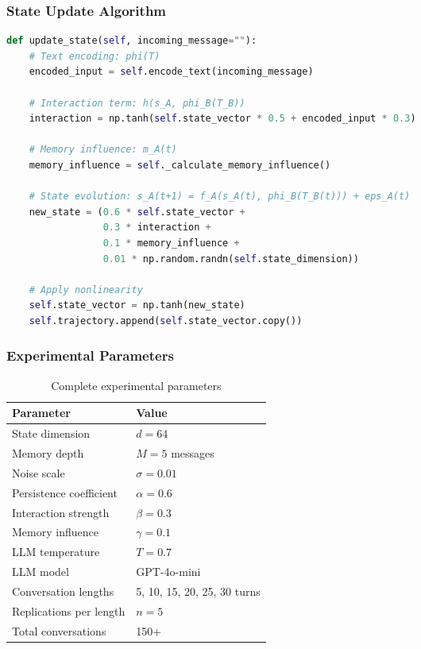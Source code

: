 \documentclass[11pt,a4paper]{article}
\begin{document}
\subsubsection{State Update Algorithm}

\begin{lstlisting}[language=Python, caption=Agent State Update Implementation]
def update_state(self, incoming_message=""):
    # Text encoding: phi(T)
    encoded_input = self.encode_text(incoming_message)
    
    # Interaction term: h(s_A, phi_B(T_B))
    interaction = np.tanh(self.state_vector * 0.5 + encoded_input * 0.3)
    
    # Memory influence: m_A(t)
    memory_influence = self._calculate_memory_influence()
    
    # State evolution: s_A(t+1) = f_A(s_A(t), phi_B(T_B(t))) + eps_A(t)
    new_state = (0.6 * self.state_vector + 
                 0.3 * interaction + 
                 0.1 * memory_influence + 
                 0.01 * np.random.randn(self.state_dimension))
    
    # Apply nonlinearity
    self.state_vector = np.tanh(new_state)
    self.trajectory.append(self.state_vector.copy())
\end{lstlisting}

\subsubsection{Experimental Parameters}

\begin{table}[ht]
\centering
\caption{Complete experimental parameters}
\begin{tabular}{@{}ll@{}}
\toprule
Parameter & Value \\
\midrule
State dimension & $d = 64$ \\
Memory depth & $M = 5$ messages \\
Noise scale & $\sigma = 0.01$ \\
Persistence coefficient & $\alpha = 0.6$ \\
Interaction strength & $\beta = 0.3$ \\
Memory influence & $\gamma = 0.1$ \\
LLM temperature & $T = 0.7$ \\
LLM model & GPT-4o-mini \\
Conversation lengths & 5, 10, 15, 20, 25, 30 turns \\
Replications per length & $n = 5$ \\
Total conversations & 150+ \\
\bottomrule
\end{tabular}
\end{table}
\end{document}
